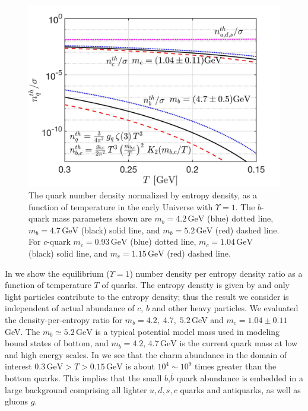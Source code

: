 \begin{figure}
\centerline{\includegraphics[width=0.9\linewidth]{./plots/bcQuarkDensity_new}}
\caption{
The quark number density normalized by entropy density, as a function of temperature in the early Universe with $\Upsilon=1$. The $b$-quark mass parameters shown are $m_b=4.2\,\mathrm{GeV}$ (blue) dotted line, $m_b=4.7\,\mathrm{GeV}$ (black) solid line, and $m_b=5.2\,\mathrm{GeV}$ (red) dashed line. For  $c$-quark  $m_c=0.93\,\mathrm{GeV}$  (blue) dotted line, $m_c=1.04\,\mathrm{GeV}$ (black) solid line, and $m_c=1.15\,\mathrm{GeV}$ (red) dashed line. }
\label{number_entropy_b002} 
\end{figure}

In  we show the equilibrium ($\Upsilon=1$) number density per entropy density  ratio as a function of temperature $T$ of quarks. The entropy density is given by  and only light particles contribute to the entropy density; thus the result we consider is independent of actual abundance of $c$, $b$ and other heavy particles. We evaluated the density-per-entropy ratio for  $m_b=4.2,\;4.7,\;5.2$\,GeV and $m_c=1.04\pm0.11$\,GeV. The $m_b\simeq 5.2\,\mathrm{GeV}$ is  a typical potential model mass used in modeling bound states of bottom, and $m_b=4.2,\,4.7\,\mathrm{GeV}$ is the current quark mass at low and high energy scales. In  we see that the charm abundance in the domain of interest $0.3\,\mathrm{GeV}>T>0.15\,\mathrm{GeV}$ is about $10^4\sim\!\!10^{9}$ times greater than the bottom quarks. This implies that the small $b$,$\bar b$ quark abundance is embedded in a large background comprising all lighter $u,d,s,c$ quarks and antiquarks, as well as gluons $g$.

